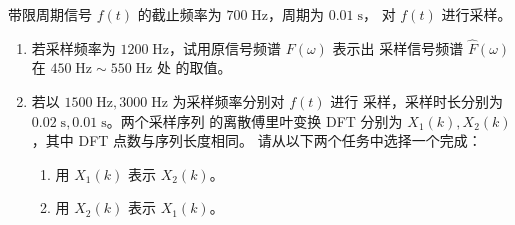 \begin{exercise}
    带限周期信号 $f(t)$ 的截止频率为 $700\;\mathrm{Hz}$，周期为 $0.01\;\mathrm{s}$，
    对 $f(t)$ 进行采样。
    \begin{enumerate}[label=(\arabic*)]
        \item 若采样频率为 $1200\;\mathrm{Hz}$，试用原信号频谱 $F(\omega)$ 表示出
            采样信号频谱 $\hat{F}(\omega)$ 在 $450\;\mathrm{Hz} \sim 550\;\mathrm{Hz}$ 处
            的取值。
        \item 若以 $1500\;\mathrm{Hz}, 3000\;\mathrm{Hz}$ 为采样频率分别对 $f(t)$ 进行
            采样，采样时长分别为 $0.02\;\mathrm{s}, 0.01\;\mathrm{s}$。两个采样序列
            的离散傅里叶变换 DFT 分别为 $X_1(k), X_2(k)$，其中 DFT 点数与序列长度相同。
            请从以下两个任务中选择一个完成：
            \begin{enumerate}[label=(\alph*)]
                \item 用 $X_1(k)$ 表示 $X_2(k)$。
                \item 用 $X_2(k)$ 表示 $X_1(k)$。
            \end{enumerate}
    \end{enumerate}
\end{exercise}

